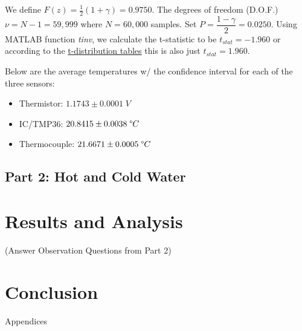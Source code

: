 \documentclass{article}
\begin{document}
We define $F(z) = \frac{1}{2}(1+\gamma) = 0.9750$. The degrees of freedom (D.O.F.) $\nu = N - 1 = 59,999$ where $N=60,000$ samples. Set $P=\dfrac{1-\gamma}{2}=0.0250$. Using MATLAB function \textit{tinv}, we calculate the t-statistic to be $t_{stat} = -1.960$ or according to the \hyperlink{1}{t-distribution tables} this is also just $t_{stat}=1.960$.

Below are the average temperatures w/ the confidence interval for each of the three sensors:
\begin{itemize}
    \item Thermistor: \(1.1743 \pm 0.0001\; V \)
    \item IC/TMP36: \(20.8415 \pm 0.0038\; \degree C\)
    \item Thermocouple: \(21.6671 \pm 0.0005\; \degree C\)
\end{itemize}


\subsection{Part 2: Hot and Cold Water}


\section{Results and Analysis}
(Answer Observation Questions from Part 2)


\section{Conclusion}




\newpage
\thispagestyle{empty}  %
\begin{center}
	\vspace*{\fill}
	{\Huge Appendices}
	\vspace*{\fill}
\end{center}
\end{document}
